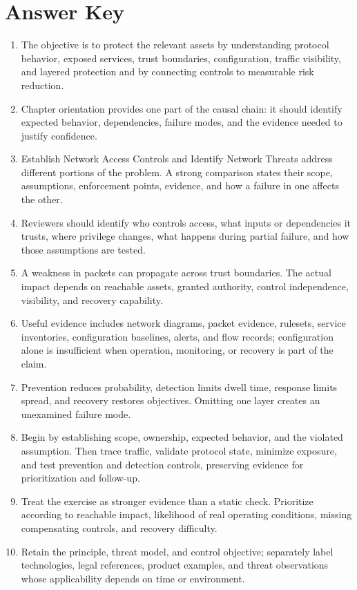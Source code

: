 \documentclass[11pt,letterpaper]{article}
\begin{document}
\section*{Answer Key}
\begin{enumerate}
\item The objective is to protect the relevant assets by understanding protocol behavior, exposed services, trust boundaries, configuration, traffic visibility, and layered protection and by connecting controls to measurable risk reduction.
\item Chapter orientation provides one part of the causal chain: it should identify expected behavior, dependencies, failure modes, and the evidence needed to justify confidence.
\item Establish Network Access Controls and Identify Network Threats address different portions of the problem. A strong comparison states their scope, assumptions, enforcement points, evidence, and how a failure in one affects the other.
\item Reviewers should identify who controls access, what inputs or dependencies it trusts, where privilege changes, what happens during partial failure, and how those assumptions are tested.
\item A weakness in packets can propagate across trust boundaries. The actual impact depends on reachable assets, granted authority, control independence, visibility, and recovery capability.
\item Useful evidence includes network diagrams, packet evidence, rulesets, service inventories, configuration baselines, alerts, and flow records; configuration alone is insufficient when operation, monitoring, or recovery is part of the claim.
\item Prevention reduces probability, detection limits dwell time, response limits spread, and recovery restores objectives. Omitting one layer creates an unexamined failure mode.
\item Begin by establishing scope, ownership, expected behavior, and the violated assumption. Then trace traffic, validate protocol state, minimize exposure, and test prevention and detection controls, preserving evidence for prioritization and follow-up.
\item Treat the exercise as stronger evidence than a static check. Prioritize according to reachable impact, likelihood of real operating conditions, missing compensating controls, and recovery difficulty.
\item Retain the principle, threat model, and control objective; separately label technologies, legal references, product examples, and threat observations whose applicability depends on time or environment.
\end{enumerate}
\end{document}
